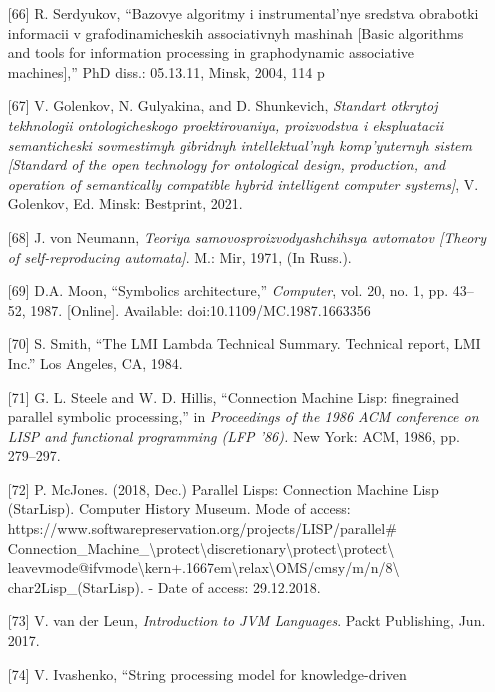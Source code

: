 \documentclass[10pt]{article}
\begin{document}
{\begin{multicols*}{2}
\begin{enumerate}
\selectfont\footnotesize
\item [{[66]}] {R. Serdyukov, “Bazovye algoritmy i instrumental’nye sredstva
obrabotki informacii v grafodinamicheskih associativnyh mashinah
[Basic algorithms and tools for information processing in
graphodynamic associative machines],”  PhD  diss.: 05.13.11,
Minsk,  2004,  114 p} 
\item [{[67]}] {V. Golenkov, N. Gulyakina, and D. Shunkevich, \textit{Standart otkrytoj
tekhnologii ontologicheskogo proektirovaniya, proizvodstva i
ekspluatacii semanticheski sovmestimyh gibridnyh intellektual’nyh
komp’yuternyh sistem [Standard of the open technology for
ontological design, production, and operation of semantically
compatible hybrid intelligent computer systems]}, V. Golenkov, Ed.
Minsk: Bestprint, 2021.} 
\item [{[68]}] {J. von Neumann, \textit {Teoriya samovosproizvodyashchihsya avtomatov [Theory of self-reproducing automata]}. M.: Mir, 1971, (In Russ.).} 
\item [{[69]}] {D.A. Moon, “Symbolics architecture,” \textit{ Computer}, vol. 20, no. 1, pp.
43–52, 1987. [Online]. Available: doi:10.1109/MC.1987.1663356} 
\item [{[70]}] {S. Smith, “The LMI Lambda Technical Summary. Technical report,
LMI Inc.” Los Angeles, CA, 1984.}  
\item [{[71]}] {G. L. Steele and W. D. Hillis, “Connection Machine Lisp: finegrained parallel symbolic processing,” in \textit{Proceedings of the 1986
ACM conference on LISP and functional programming (LFP ’86).}
New York: ACM, 1986, pp. 279–297.} 
\item [{[72]}] {P. McJones. (2018, Dec.) Parallel Lisps: Connection Machine Lisp (StarLisp). Computer History Museum. Mode of access:
https://www.softwarepreservation.org/projects/LISP/parallel\#\\Connection\_Machine\_\textbackslash protect\textbackslash discretionary{\textbackslash protect\textbackslash protect\textbackslash
\\leavevmode@ifvmode\textbackslash kern+.1667em\textbackslash relax\textbackslash OMS/cmsy/m/n/8\textbackslash
\\char2}{}{}Lisp\_(StarLisp). - Date of access: 29.12.2018.}
\item[{[73]}] {V. van der Leun, \textit{Introduction to JVM Languages}. Packt
Publishing, Jun. 2017.} 
\item[{[74]}] {V. Ivashenko, “String processing model for knowledge-driven
}
\end{enumerate}
\end{multicols*}}
\end{document}
